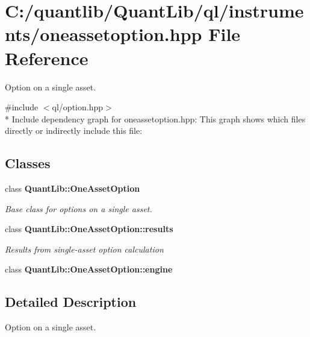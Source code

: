 \section{C\+:/quantlib/\+Quant\+Lib/ql/instruments/oneassetoption.hpp File Reference}
\label{oneassetoption_8hpp}


Option on a single asset.  


{\ttfamily \#include $<$ql/option.\+hpp$>$}\\*
Include dependency graph for oneassetoption.\+hpp\+:
This graph shows which files directly or indirectly include this file\+:
\subsection*{Classes}
\begin{DoxyCompactItemize}
\item 
class {\bf Quant\+Lib\+::\+One\+Asset\+Option}
\begin{DoxyCompactList}\small\item\em Base class for options on a single asset. \end{DoxyCompactList}\item 
class {\bf Quant\+Lib\+::\+One\+Asset\+Option\+::results}
\begin{DoxyCompactList}\small\item\em Results from single-\/asset option calculation \end{DoxyCompactList}\item 
class {\bf Quant\+Lib\+::\+One\+Asset\+Option\+::engine}
\end{DoxyCompactItemize}


\subsection{Detailed Description}
Option on a single asset. 

